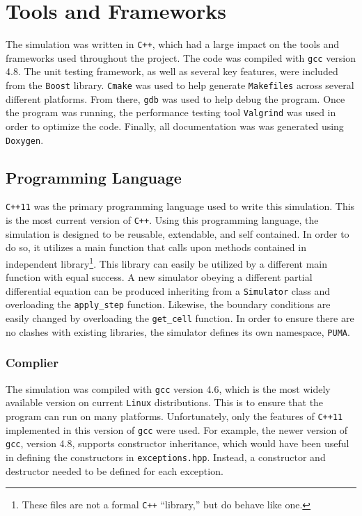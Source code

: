 \documentclass[a4paper,11pt]{article}
\begin{document}
\section{Tools and Frameworks}

The simulation was written in \texttt{C++}, which had a large impact on the tools and frameworks used throughout the project.  The code was compiled with \texttt{gcc} version 4.8.  The unit testing framework, as well as several key features, were included from the \texttt{Boost} library.  \texttt{Cmake} was used to help generate \texttt{Makefiles} across several different platforms.  From there, \texttt{gdb} was used to help debug the program.  Once the program was running, the performance testing tool \texttt{Valgrind} was used in order to optimize the code.  Finally, all documentation was was generated using \texttt{Doxygen}.

\subsection{Programming Language}

\texttt{C++11} was the primary programming language used to write this simulation.  This is the most current version of \texttt{C++}.  Using this programming language, the simulation is designed to be  reusable, extendable, and self contained. In order to do so, it utilizes a main function that calls upon methods contained in independent library\footnote{These files are not a formal \texttt{C++} ``library,'' but do behave like one.}.  This library can easily be utilized by a different main function with equal success.  A new simulator obeying a different partial differential equation can be produced inheriting from a \texttt{Simulator} class and overloading the \texttt{apply\_step} function.  Likewise, the boundary conditions are easily changed by overloading the \texttt{get\_cell} function.  In order to ensure there are no clashes with existing libraries, the simulator defines its own namespace, \texttt{PUMA}.   

\subsubsection{Complier}

The simulation was compiled with \texttt{gcc} version 4.6, which is the most widely available version on current \texttt{Linux} distributions.  This is to ensure that the program can run on many platforms.  Unfortunately, only the features of \texttt{C++11} implemented in this version of \texttt{gcc} were used.  For example, the newer version of \texttt{gcc}, version 4.8, supports constructor inheritance, which would have been useful in defining the constructors in \texttt{exceptions.hpp}.  Instead, a constructor and destructor needed to be defined for each exception. 
\end{document}
